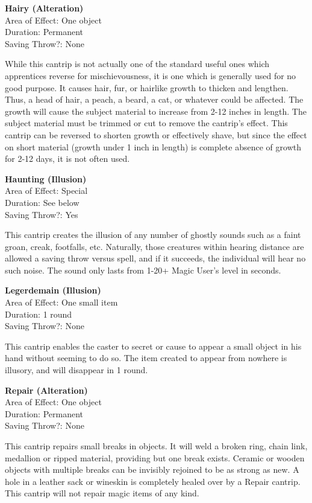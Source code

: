 \documentclass[letterpaper,sansserif,tightsqueeze]{rpg-module}
\begin{document}
\begin{samepage}	
\textbf{Hairy (Alteration)}\\
Area of Effect: One object\\
Duration: Permanent\\
Saving Throw?: None

\nopagebreak	
While this cantrip is not actually one of the standard useful ones which apprentices reverse for mischievousness, it is one which is generally used for no good purpose. It causes hair, fur, or hairlike growth to thicken and lengthen. Thus, a head of hair, a peach, a beard, a cat, or whatever could be affected. The growth will cause the subject material to increase from 2-12 inches in length. The subject material must be trimmed or cut to remove the cantrip’s effect. This cantrip can be reversed to shorten growth or effectively shave, but since the effect on short material (growth under 1 inch in length) is complete absence of growth for 2-12 days, it is not often used.
\end{samepage}

\begin{samepage}	
\textbf{Haunting (Illusion)}\\
Area of Effect: Special\\
Duration: See below\\
Saving Throw?: Yes

\nopagebreak
This cantrip creates the illusion of any number of ghostly sounds such as a faint groan, creak, footfalls, etc. Naturally, those creatures within hearing distance are allowed a saving throw versus spell, and if it succeeds, the individual will hear no such noise. The sound only lasts from 1-20+ Magic User’s level in seconds.
\end{samepage}

\begin{samepage}
\textbf{Legerdemain (Illusion)}\\
Area of Effect: One small item\\
Duration: 1 round\\
Saving Throw?: None

\nopagebreak
This cantrip enables the caster to secret or cause to appear a small object in his hand without seeming to do so. The item created to appear from nowhere is illusory, and will disappear in 1 round.
\end{samepage}

\begin{samepage}	
\textbf{Repair (Alteration)}\\
Area of Effect: One object\\
Duration: Permanent\\
Saving Throw?: None

\nopagebreak	
This cantrip repairs small breaks in objects. It will weld a broken ring, chain link, medallion or ripped material, providing but one break exists. Ceramic or wooden objects with multiple breaks can be invisibly rejoined to be as strong as new. A hole in a leather sack or wineskin is completely healed over by a Repair cantrip. This cantrip will not repair magic items of any kind.
\end{samepage}
\end{document}
